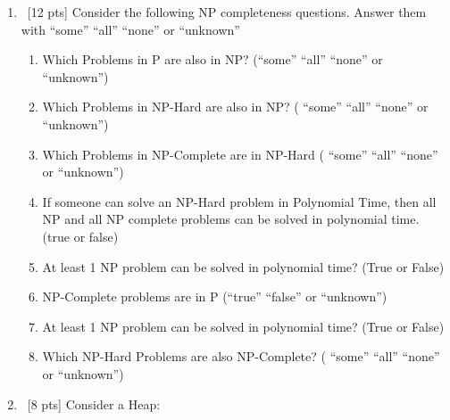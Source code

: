 \documentclass[12pt]{article}
\newenvironment{sol}[1][Solution]{\begin{trivlist}\item[\hskip\labelsep {\bfseries #1:}]}{\end{trivlist}}
\begin{document}
\begin{enumerate}
    \item \ [12 pts] Consider the following NP completeness questions. Answer them with “some” “all” “none” or “unknown”
    \begin{enumerate}
        \item Which Problems in P are also in NP? (“some” “all” “none” or “unknown”)
        \item Which Problems in NP-Hard are also in NP? ( “some” “all” “none” or “unknown”)
        \item Which Problems in NP-Complete are in NP-Hard ( “some” “all” “none” or “unknown”)
        \item If someone can solve an NP-Hard problem in Polynomial Time, then all NP and all NP complete problems can be solved in polynomial time. (true or false)
        \item At least 1 NP problem can be solved in polynomial time? (True or False)
        \item NP-Complete problems are in P (“true” “false” or “unknown”)
        \item At least 1 NP problem can be solved in polynomial time? (True or False)
        \item Which NP-Hard Problems are also NP-Complete? ( “some” “all” “none” or “unknown”)
    
    \end{enumerate}
    \item \ [8 pts] Consider a Heap:


\end{enumerate}
\end{document}
